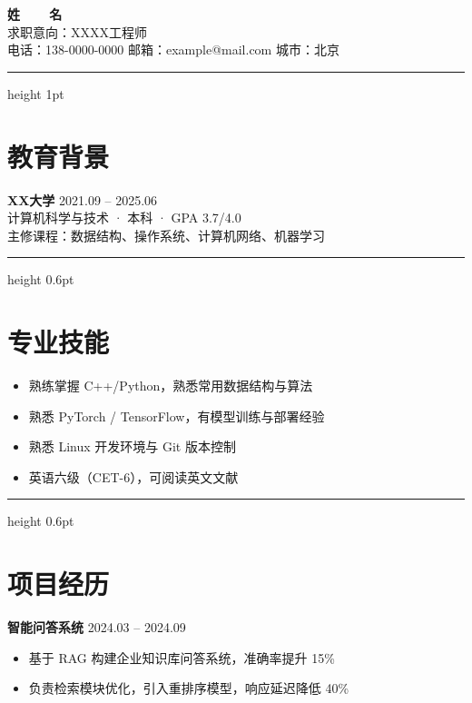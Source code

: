 \documentclass[UTF8,a4paper,11pt]{ctexart}
\begin{document}
\begin{center}
  {\fontsize{22}{26}\selectfont\bfseries 姓~~~~名} \\[0.6em]
  {\large 求职意向：XXXX工程师} \\[0.3em]
  {\small 电话：138-0000-0000 \quad 邮箱：example@mail.com \quad 城市：北京}
\end{center}

\vspace{1em}
{\color{accent}\hrule height 1pt}
\vspace{1.2em}

\section*{\textcolor{accent}{教育背景}}
\textbf{XX大学} \hfill 2021.09 -- 2025.06 \\
计算机科学与技术 · 本科 · GPA 3.7/4.0 \\[0.5em]
主修课程：数据结构、操作系统、计算机网络、机器学习

\vspace{0.8em}
{\color{accent}\hrule height 0.6pt}
\vspace{1em}

\section*{\textcolor{accent}{专业技能}}
\begin{itemize}
  \item 熟练掌握 C++/Python，熟悉常用数据结构与算法
  \item 熟悉 PyTorch / TensorFlow，有模型训练与部署经验
  \item 熟悉 Linux 开发环境与 Git 版本控制
  \item 英语六级（CET-6），可阅读英文文献
\end{itemize}

\vspace{0.5em}
{\color{accent}\hrule height 0.6pt}
\vspace{1em}

\section*{\textcolor{accent}{项目经历}}
\textbf{智能问答系统} \hfill 2024.03 -- 2024.09 \\
\begin{itemize}
  \item 基于 RAG 构建企业知识库问答系统，准确率提升 15\%
  \item 负责检索模块优化，引入重排序模型，响应延迟降低 40\%
\end{itemize}
\end{document}
